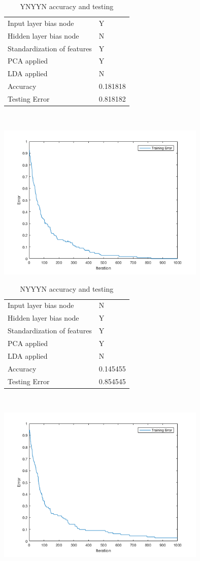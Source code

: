 \documentclass[12pt]{article}
\newcommand{\accuracyAndTestErrorTable}[8]{
  \begin{tabular}{l|l}
    \hline
    Input layer bias node & #1 \\
    Hidden layer bias node & #2 \\
    Standardization of features & #3 \\
    PCA applied & #4 \\
    LDA applied & #5 \\
    \hline
    Accuracy & #6 \\
    Testing Error & #7 \\
    \hline
  \end{tabular}
  ~\\[60pt]
  \caption{#8}
}
\begin{document}


\begin{center}
  \begin{table}[H]
    \begin{varwidth}[b]{0.4\linewidth}
      \centering
      \accuracyAndTestErrorTable{Y}{N}{Y}{Y}{N}{0.181818}{0.818182}{YNYYN accuracy and testing}
      \label{table:YNYYN}
    \end{varwidth}%
    \hfill
    \begin{minipage}[b]{0.6\linewidth}
      \centering
      \includegraphics[width=100mm]{YNYYN_training_error.png}
      \label{fig:YNYYN}
    \end{minipage}
  \end{table}
\end{center}




\begin{center}
  \begin{table}[H]
    \begin{varwidth}[b]{0.4\linewidth}
      \centering
      \accuracyAndTestErrorTable{N}{Y}{Y}{Y}{N}{0.145455}{0.854545}{NYYYN accuracy and testing}
      \label{table:NYYYN}
    \end{varwidth}%
    \hfill
    \begin{minipage}[b]{0.6\linewidth}
      \centering
      \includegraphics[width=100mm]{NYYYN_training_error.png}
      \label{fig:NYYYN}
    \end{minipage}
  \end{table}
\end{center}
\end{document}
